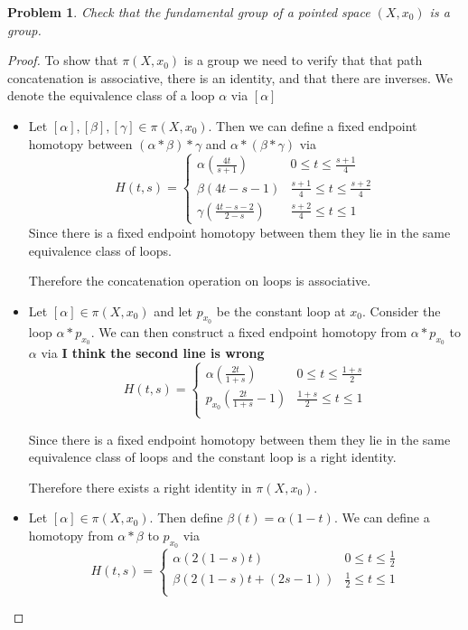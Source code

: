 \documentclass[10pt]{article}
\newcommand{\sk}{\vskip 10mm}
\theoremstyle{plain}
\newtheorem{problem}{Problem}
\theoremstyle{remark}
\begin{document}
\sk

\begin{problem} %
  Check that the fundamental group of a pointed space $(X,x_0)$ is a group.
\end{problem}

\begin{proof} To show that $\pi(X,x_0)$ is a group we need to verify that
  that path concatenation is associative, there is an identity, and that there are inverses.
  We denote the equivalence class of a loop $\alpha$ via $[\alpha]$
  \begin{itemize}
  \item Let $[\alpha],[\beta],[\gamma]\in\pi(X,x_0)$. Then we can define a fixed endpoint
    homotopy between $(\alpha*\beta)*\gamma$ and $\alpha*(\beta*\gamma)$ via
    \[
      H(t,s) = \left\{
        \begin{array}{cc}
          \alpha(\frac{4t}{s+1}) & 0\leq t \leq \frac{s+1}{4}\\
          \beta(4t-s-1) & \frac{s+1}{4}\leq t\leq \frac{s+2}{4}\\
          \gamma(\frac{4t-s-2}{2-s}) & \frac{s+2}{4} \leq t \leq 1
        \end{array}
      \right. 
    \]
    Since there is a fixed endpoint homotopy between them they lie in the same
    equivalence class of loops.

    Therefore the concatenation operation on loops is associative.
  \item Let $[\alpha]\in\pi(X,x_0)$ and let $p_{x_0}$ be the constant loop at $x_0$.
    Consider the loop $\alpha*p_{x_0}$. We can then construct a fixed endpoint homotopy from
    $\alpha*p_{x_0}$ to $\alpha$ via \textbf{I think the second line is wrong}
    \[
      H(t,s)=\left\{
        \begin{array}{cc}
          \alpha(\frac{2t}{1+s}) & 0 \leq t \leq \frac{1+s}{2}\\
          p_{x_0}(\frac{2t}{1+s}-1) & \frac{1+s}{2}\leq t\leq 1\\
        \end{array}
      \right.
    \]

    Since there is a fixed endpoint homotopy between them they lie in the same equivalence
    class of loops and the constant loop is a right identity.
    
    Therefore there exists a right identity in $\pi(X,x_0)$.
  \item Let $[\alpha]\in\pi(X,x_0)$. Then define $\beta(t)=\alpha(1-t)$. We can define
    a homotopy from $\alpha*\beta$ to $p_{x_0}$ via
    \[
      H(t,s) = \left\{
        \begin{array}{cc}
          \alpha(2(1-s)t) & 0 \leq t \leq \frac{1}{2}\\
          \beta(2(1-s)t+(2s-1)) & \frac{1}{2}\leq t\leq 1\\                            
        \end{array}
      \right.
    \]


\end{itemize}
\end{proof}
\end{document}
